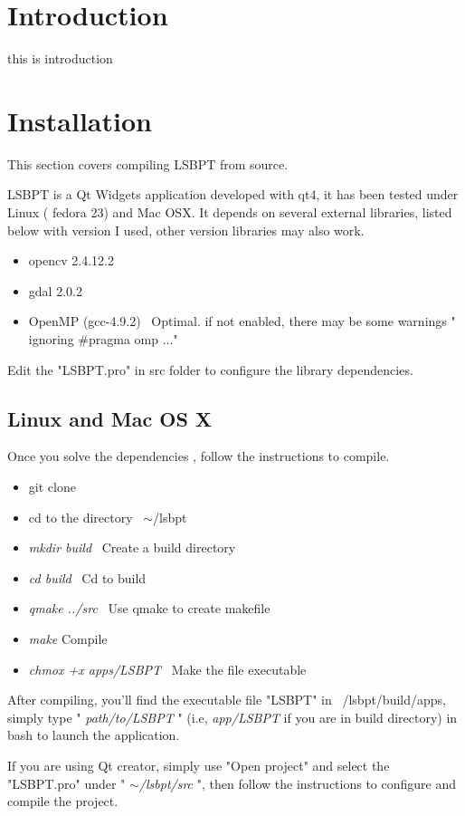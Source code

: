 \documentclass[10pt,a4paper]{article}
\begin{document}
\newpage
\tableofcontents
\newpage

\section{Introduction}
this is introduction
\section{Installation}
This section covers compiling LSBPT from source.

LSBPT is a Qt Widgets application developed with qt4, it has been tested under Linux ( fedora 23) and Mac OSX. It depends on several external libraries, listed below with version I used, other version libraries may also work.
\begin{itemize}
	\item opencv 2.4.12.2
	\item gdal 2.0.2
	\item OpenMP (gcc-4.9.2) \ Optimal. if not enabled, there may be some warnings " ignoring \#pragma omp ..."
\end{itemize}

Edit the "LSBPT.pro" in src folder to configure the library dependencies. 

\subsection{Linux and Mac OS X}
Once you solve the dependencies , follow the instructions to compile.
\begin{itemize}
	\item git clone 
	\item cd to the directory \ $\sim$/lsbpt
	\item \textit{ mkdir build } \ Create a build directory
	\item \textit{ cd build } \ Cd to build
	\item \textit{ qmake ../src } \ Use qmake to create makefile
	\item \textit{ make } Compile
	\item \textit{ chmox +x apps/LSBPT } \ Make the file executable
\end{itemize}
After compiling, you'll find the executable file "LSBPT" in ~/lsbpt/build/apps, simply type " \textit{path/to/LSBPT} " (i.e, \textit{app/LSBPT}  if you are in build directory) in bash to launch the application.

If you are using Qt creator, simply use "Open project" and select the "LSBPT.pro" under 
" \textit{$\sim$/lsbpt/src} ", then follow the instructions to configure  and compile the project.
\end{document}
